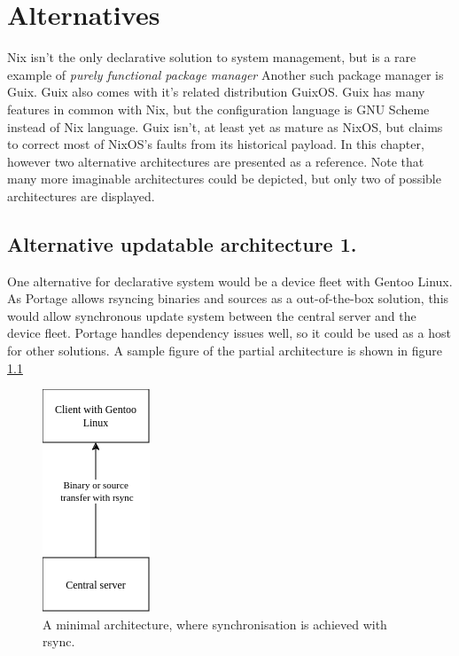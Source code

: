 \chapter{Alternatives} \label{alternatives}
Nix isn't the only declarative solution to system management, but is a
rare example of \textit{purely functional package manager} Another
such package manager is Guix. Guix also comes with it's related
distribution GuixOS. Guix has many features in common with Nix, but
the configuration language is GNU Scheme instead of Nix language. Guix
isn't, at least yet as mature as NixOS, but claims to correct most of
NixOS's faults from its historical payload. In this chapter, however
two alternative architectures are presented as a reference. Note that
many more imaginable architectures could be depicted, but only two of
possible architectures are displayed. \cite{dolstra2010nixos}
\cite{courtes2013functional}

\section{Alternative updatable architecture 1.}
One alternative for declarative system would be a device fleet with
Gentoo Linux. As Portage allows rsyncing binaries and sources as a
out-of-the-box solution, this would allow synchronous update system
between the central server and the device fleet. Portage handles
dependency issues well, so it could be used as a host for other
solutions. A sample figure of the partial architecture is shown in
figure \ref{gentooarchitecture} \cite{thiruvathukal2004gentoo}
\begin{figure}[H]
\centering
\includegraphics[scale=0.8]{latex/kuvat/gentooarchitecture.drawio.png}
\caption{A minimal architecture, where synchronisation is achieved
  with rsync.}
\label{gentooarchitecture}
\end{figure}

